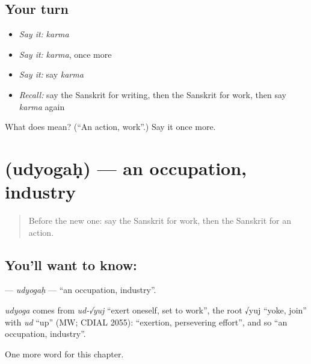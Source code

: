 \subsection*{Your turn}
\begin{itemize}
\raggedright
  \item \emph{Say it:} \emph{karma}
  \item \emph{Say it:} \emph{karma}, once more
  \item \emph{Say it:} say \emph{karma}
  \item \emph{Recall:} say the Sanskrit for writing, then the Sanskrit for work, then say \emph{karma} again
\end{itemize}

\begin{tcolorbox}[breakable,colback=teal!4,colframe=teal!35!black,title={Before you move on}]
What does  mean? (\textquotedblleft{}An action, work\textquotedblright{}.) Say it once more.
\end{tcolorbox}
\section[\texorpdfstring{\sk{उद्योगः} (udyogaḥ)}{उद्योगः (udyogaḥ)}]{ (udyogaḥ) — an occupation, industry}

\label{lesson:SA-C170-udyogah}



\begin{quote}
Before the new one: say the Sanskrit for work, then the Sanskrit for an action.
\end{quote}

\subsection*{You'll want to know: }
\textbf{} — \emph{udyogaḥ} — \textquotedblleft{}an occupation, industry\textquotedblright{}.

\begin{cousinweb}
\emph{udyoga} comes from \emph{ud-√yuj} \textquotedblleft{}exert oneself, set to work\textquotedblright{}, the root √yuj \textquotedblleft{}yoke, join\textquotedblright{} with \emph{ud} \textquotedblleft{}up\textquotedblright{} (MW; CDIAL 2055): \textquotedblleft{}exertion, persevering effort\textquotedblright{}, and so \textquotedblleft{}an occupation, industry\textquotedblright{}.
\end{cousinweb}

\begin{grammarlens}[title={What you've built}]
One more word for this chapter.
\end{grammarlens}

